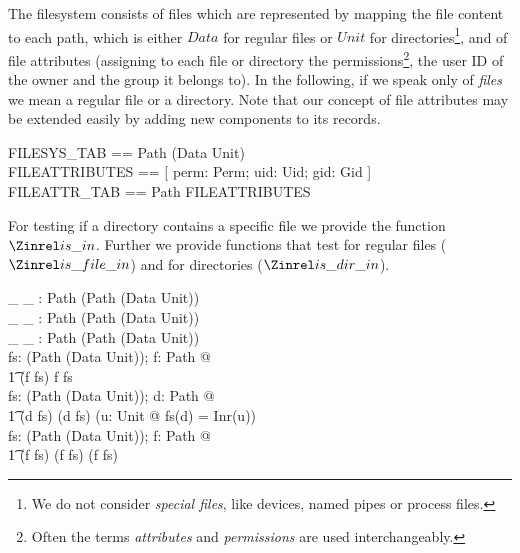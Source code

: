 The filesystem consists of files which are represented by mapping the
file content to each path, which is either $Data$ for regular
files or $Unit$ for directories\footnote{We do not
  consider \emph{special files}, like devices,
  named pipes or process files.}, and of file
attributes (assigning to each file or directory the
permissions\footnote{Often the terms
  \emph{attributes} and
  \emph{permissions} are used interchangeably.}, the
user ID of the owner and the group it belongs to). In the following,
if we speak only of \emph{files} we mean a regular file or a
directory.  Note that our concept of file attributes may be extended
easily by adding new components to its records.
\begin{zed}
  FILESYS\_TAB == Path \pfun (Data \pplus Unit) \\
  FILEATTRIBUTES == [ perm: \power Perm; uid: Uid; gid: Gid ] \\
  FILEATTR\_TAB == Path \pfun FILEATTRIBUTES \\
\end{zed}

For testing if a directory contains a specific file we provide the function
$\isin$.  Further we provide functions that test for regular files ($\isfilein$)
and for directories ($\isdirin$).
\begin{axdef}
  \_ \isin \_     : Path  \rel (Path \pfun (Data \pplus Unit))  \\
  \_ \isdirin \_  : Path  \rel (Path \pfun (Data \pplus Unit))  \\
  \_ \isfilein \_ : Path  \rel (Path \pfun (Data \pplus Unit))  \\
  \where
  \forall fs: (Path \pfun (Data \pplus Unit)); f: Path @ \\
  \t1 (f \isin fs) \iff f \in \dom fs \\

  \forall fs: (Path \pfun (Data \pplus Unit)); d: Path @ \\
  \t1 (d \isdirin fs) \iff (d \isin fs) \land (\exists u: Unit @ fs(d) = Inr(u))
  \\

  \forall fs: (Path \pfun (Data \pplus Unit)); f: Path @ \\
  \t1 (f \isfilein fs) \iff (f \isin fs) \land \lnot (f \isdirin fs) \\
\end{axdef}
  

